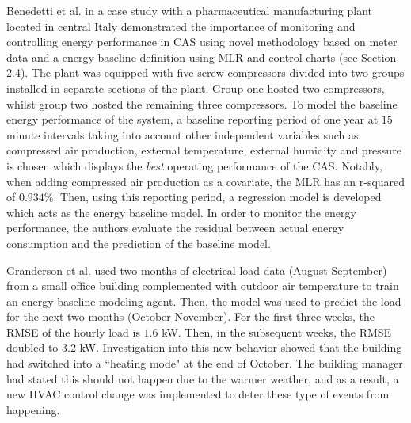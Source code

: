 Benedetti et al. \cite{cas} in a case study with a pharmaceutical manufacturing plant located in central Italy demonstrated the importance of monitoring and controlling energy performance in \ac{CAS} using novel methodology based on meter data and a energy baseline definition using MLR and control charts (see \hyperlink{subsection.2.4}{Section 2.4}). The plant was equipped with five screw compressors divided into two groups installed in separate sections of the plant. Group one hosted two compressors, whilst group two hosted the remaining three compressors. To model the baseline energy performance of the system, a baseline reporting period of one year at $15$ minute intervals taking into account other independent variables such as compressed air production, external temperature, external humidity and pressure is chosen which displays the \textit{best} operating performance of the CAS. Notably, when adding compressed air production as a covariate, the MLR has an \ac{r-squared} of $0.934\%$. Then, using this reporting period, a regression model is developed which acts as the energy baseline model. In order to monitor the energy performance, the authors evaluate the residual between actual energy consumption and the prediction of the baseline model.

Granderson et al. \cite{lawrence-lab} used two months of electrical load data (August-September) from a small office building complemented with outdoor air temperature to train an energy baseline-modeling agent. Then, the model was used to predict the load for the next two months (October-November). For the first three weeks, the \ac{RMSE} of the hourly load is $1.6$ \ac{kW}. Then, in the subsequent weeks, the RMSE doubled to $3.2$ kW. Investigation into this new behavior showed that the building had switched into a ``heating mode" at the end of October. The building manager had stated this should not happen due to the warmer weather, and as a result, a new \ac{HVAC} control change was implemented to deter these type of events from happening. 

